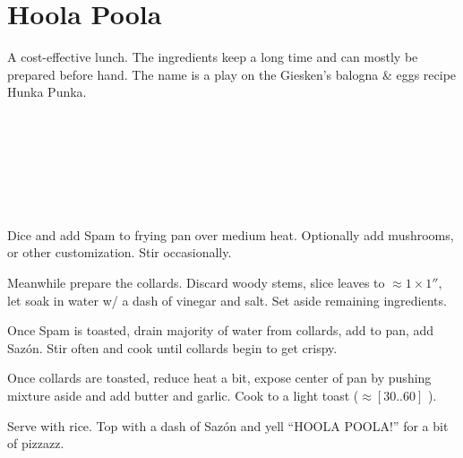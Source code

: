 \section{Hoola Poola}

\begin{recipestats}[
        servings=1 person,
        preptime=10 \minute,
        bakingtime=20 \minute,
        source=Mike,
    ]
\end{recipestats}

\begin{recipeabstract}
    A cost-effective lunch.
    The ingredients keep a long time and can mostly be prepared before hand.
    The name is a play on the Giesken's balogna \& eggs recipe Hunka Punka. %
\end{recipeabstract}

\begin{ingredientcolumns}
    \begin{ingredientblock}
        \\
        \\
        \\
    \end{ingredientblock}
    \begin{ingredientblock}
        \\
        \\
    \end{ingredientblock}
\end{ingredientcolumns}

\begin{preparation}
\item Dice and add Spam to frying pan over medium heat.
    Optionally add mushrooms, or other customization.
    Stir occasionally.

\item Meanwhile prepare the collards.
    Discard woody stems, slice leaves to $\approx1\times1''$, let soak in water w/ a
    dash of vinegar and salt.
    Set aside remaining ingredients.

\item Once Spam is toasted, drain majority of water from collards, add to pan, add Saz\'on.
    Stir often and cook until collards begin to get crispy.

\item Once collards are toasted, reduce heat a bit, expose center of pan by pushing
    mixture aside and add butter and garlic.
    Cook to a light toast ($\approx[30..60]$ \second).

\item Serve with rice.
    Top with a dash of Saz\'on and yell ``HOOLA POOLA!'' for a bit of pizzazz.
\end{preparation}

\recipeend%
